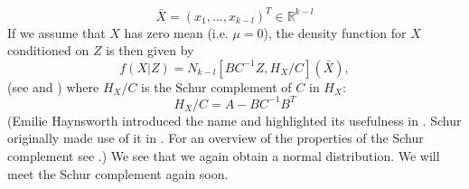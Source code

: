 \documentclass[11pt, a4paper]{article}
\newcommand{\R}{\mathbb{R}}
\begin{document}
\begin{equation}
	\bar X = (x_1, \ldots, x_{k-l})^T\in \R^{k-l}
\end{equation}
If we assume that $X$ has zero mean (i.e. $\mu=0$), the density function for $X$ conditioned on $Z$ is then given by
\begin{equation}
	f(X \vert Z ) = N_{k-l}[BC^{-1}Z, H_X/C ](\bar X),
\end{equation}
(see \cite[chapter 8]{rao} and \cite{cottle}) where $H_X/C$ is the Schur complement of $C$ in $H_X$:
\begin{equation}\label{eqn.hxc}
	H_X/C = A - B C^{-1}B^T
\end{equation}
(Emilie Haynsworth introduced the name and highlighted its usefulness in \cite{hayns}. Schur originally made use of it in \cite{schur}. For an overview of the properties of the Schur complement see \cite{horn}.) We see that we again obtain a normal distribution. We will meet the Schur complement again soon.
\end{document}
